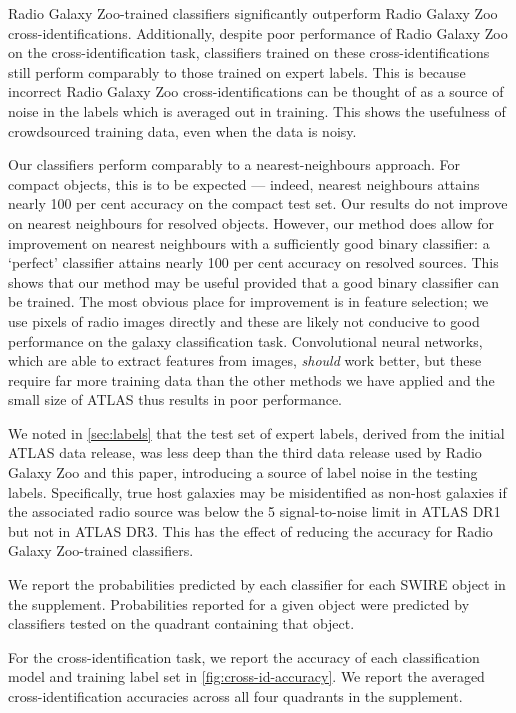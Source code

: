 \documentclass[fleqn,usenatbib,usedcolumn]{mnras}
\begin{document}
    Radio Galaxy Zoo-trained classifiers significantly outperform Radio Galaxy Zoo cross-identifications. Additionally, despite poor performance of Radio Galaxy Zoo on the cross-identification task, classifiers trained on these cross-identifications still perform comparably to those trained on expert labels. This is because incorrect Radio Galaxy Zoo cross-identifications can be thought of as a source of noise in the labels which is averaged out in training. This shows the usefulness of crowdsourced training data, even when the data is noisy.

    Our classifiers perform comparably to a nearest-neighbours approach. For compact objects, this is to be expected --- indeed, nearest neighbours attains nearly 100 per cent accuracy on the compact test set. Our results do not improve on nearest neighbours for resolved objects. However, our method does allow for improvement on nearest neighbours with a sufficiently good binary classifier: a `perfect' classifier attains nearly 100 per cent accuracy on resolved sources. This shows that our method may be useful provided that a good binary classifier can be trained. The most obvious place for improvement is in feature selection; we use pixels of radio images directly and these are likely not conducive to good performance on the galaxy classification task. Convolutional neural networks, which are able to extract features from images, \emph{should} work better, but these require far more training data than the other methods we have applied and the small size of ATLAS thus results in poor performance.

    We noted in \autoref{sec:labels} that the test set of expert labels, derived from the initial ATLAS data release, was less deep than the third data release used by Radio Galaxy Zoo and this paper, introducing a source of label noise in the testing labels. Specifically, true host galaxies may be misidentified as non-host galaxies if the associated radio source was below the 5 signal-to-noise limit in ATLAS DR1 but not in ATLAS DR3. This has the effect of reducing the accuracy for Radio Galaxy Zoo-trained classifiers.

    We report the probabilities predicted by each classifier for each SWIRE
    object in the supplement. Probabilities reported for a given object
    were predicted by classifiers tested on the quadrant containing that
    object.

    For the cross-identification task, we report the accuracy of each
    classification model and training label set in
    \autoref{fig:cross-id-accuracy}. We report the averaged
    cross-identification accuracies across all four quadrants in the supplement.
\end{document}
